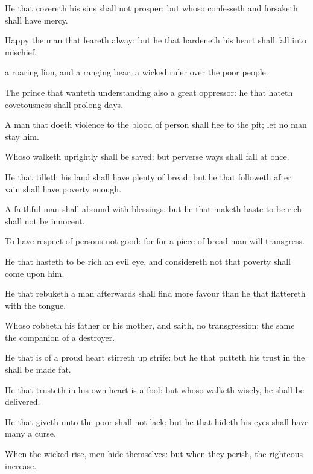 {He that
covereth his
sins shall not
prosper: but whoso
confesseth and
forsaketh
{} shall have
mercy.

Happy
{} the
man that
feareth
alway: but he that
hardeneth his
heart shall
fall into
mischief.

 a
roaring
lion, and a
ranging
bear;
{} a
wicked
ruler over the
poor
people.

The
prince that
wanteth
understanding
{} also a
great
oppressor:
{} he that
hateth
covetousness shall
prolong
{}
days.

A
man that doeth
violence to the
blood of
{}
person shall
flee to the
pit; let no man
stay him.

Whoso
walketh
uprightly shall be
saved: but
{}
perverse
{}
ways shall
fall at
once.

He that
tilleth his
land shall have
plenty of
bread: but he that
followeth after
vain
{} shall have poverty
enough.

A
faithful
man shall
abound with
blessings: but he that maketh
haste to be
rich shall not be
innocent.

To have
respect of
persons
{} not
good: for for a
piece of
bread
{}
man will
transgress.

He that
hasteth to be
rich
{} an
evil
eye, and
considereth not that
poverty shall
come upon him.

He that
rebuketh a
man
afterwards shall
find more
favour than he that
flattereth with the
tongue.

Whoso
robbeth his
father or his
mother, and
saith,
{} no
transgression; the same
{} the
companion of a
destroyer.

He that is of a
proud
heart stirreth
up
strife: but he that putteth his
trust in the
{} shall be made
fat.

He that
trusteth in his own
heart is a
fool: but whoso
walketh
wisely, he shall be
delivered.

He that
giveth unto the
poor shall not
lack: but he that
hideth his
eyes shall have
many a
curse.

When the
wicked
rise,
men
hide themselves: but when they
perish, the
righteous
increase.




}
